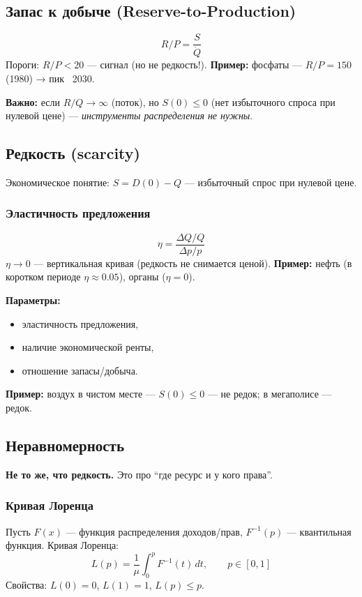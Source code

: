 \documentclass[12pt]{article}
\begin{document}
\subsection{Запас к добыче (Reserve-to-Production)}
$$
R/P = \frac{S}{\dot{Q}}
$$
Пороги: $R/P<20$ — сигнал (но не редкость!).
\textbf{Пример:} фосфаты — $R/P=150$ (1980) → пик ~2030.



\textbf{Важно:} если $R/Q \to \infty$ (поток), но $S(0) \le 0$ (нет избыточного спроса при нулевой цене) ---
\emph{инструменты распределения не нужны}.

\subsection{Редкость (scarcity)}
Экономическое понятие: $S = D(0) - Q$ --- избыточный спрос при нулевой цене.

\subsubsection{Эластичность предложения}
$$
\eta = \frac{\Delta Q/Q}{\Delta p/p}
$$
$\eta \to 0$ — вертикальная кривая (редкость не снимается ценой).
\textbf{Пример:} нефть (в коротком периоде $\eta\approx 0.05$), органы ($\eta=0$).

\textbf{Параметры:}
\begin{itemize}
\item эластичность предложения,
\item наличие экономической ренты,
\item отношение запасы/добыча.
\end{itemize}

\textbf{Пример:} воздух в чистом месте --- $S(0) \le 0$ --- не редок; в мегаполисе --- редок.

\subsection{Неравномерность}
\textbf{Не то же, что редкость.} Это про ``где ресурс и у кого права''.
\subsubsection{Кривая Лоренца}
Пусть $F(x)$ — функция распределения доходов/прав, $F^{-1}(p)$ — квантильная функция.
Кривая Лоренца:
$$
L(p) = \frac{1}{\mu}\int_0^p F^{-1}(t)\,dt,\qquad p\in[0,1]
$$
Свойства: $L(0)=0$, $L(1)=1$, $L(p)\le p$.
\end{document}
